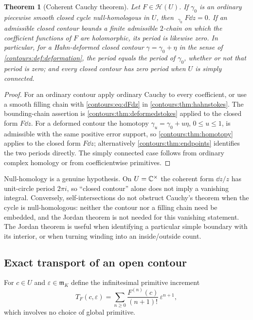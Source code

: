 \documentclass[11pt,letterpaper]{article}
\newtheorem{theorem}{Theorem}[section]
\theoremstyle{definition}
\theoremstyle{remark}
\newcommand{\HH}{\mathcal H}\newcommand{\A}{\mathscr A}\newcommand{\OO}{\mathcal O}
\newcommand{\m}{\mathfrak m}\newcommand{\st}{\operatorname{st}}
\newcommand{\HCoint}{\mathop{\oint^{\!H}}\nolimits}
\numberwithin{equation}{section}
\begin{document}
\begin{theorem}[Coherent Cauchy theorem]\label{contours:thm:cauchy}
Let $F\in\HH(U)$. If $\gamma_0$ is an ordinary piecewise smooth closed cycle
null-homologous in $U$, then $\HCoint_{\gamma_0}F\dd z=0$. If an admissible closed
contour bounds a finite admissible $2$-chain on which the coefficient functions of
$F$ are holomorphic, its period is likewise zero. In particular, for a
Hahn-deformed closed contour $\gamma=\gamma_0+\eta$ in the sense of
\cref{contours:def:deformation}, the period equals the period of $\gamma_0$,
whether or not that period is zero; and every closed contour has zero period when
$U$ is simply connected.
\end{theorem}
\begin{proof}
For an ordinary contour apply ordinary Cauchy to every coefficient, or use a smooth
filling chain with \eqref{contours:eq:dFdz} in \cref{contours:thm:hahnstokes}. The
bounding-chain assertion is \cref{contours:thm:deformedstokes} applied to the
closed form $F\dd z$. For a deformed contour the homotopy $\gamma_u=\gamma_0+u\eta$,
$0\le u\le1$, is admissible with the same positive error support, so
\cref{contours:thm:homotopy} applies to the closed form $F\dd z$; alternatively
\cref{contours:thm:endpoints} identifies the two periods directly. The simply
connected case follows from ordinary complex homology or from coefficientwise
primitives.
\end{proof}

Null-homology is a genuine hypothesis. On $U=\mathbb C^\times$ the coherent form
$\dd z/z$ has unit-circle period $2\pi i$, so ``closed contour'' alone does not
imply a vanishing integral. Conversely, self-intersections do not obstruct
Cauchy's theorem when the cycle is null-homologous: neither the contour nor a
filling chain need be embedded, and the Jordan theorem is not needed for this
vanishing statement. The Jordan theorem is useful when identifying a particular
simple boundary with its interior, or when turning winding into an inside/outside
count.

\subsection{Exact transport of an open contour}
For $c\in U$ and $\varepsilon\in\m_K$ define the infinitesimal primitive increment
\begin{equation}\label{contours:eq:endpointT}
  T_F(c,\varepsilon)=\sum_{n\ge0}\frac{F^{(n)}(c)}{(n+1)!}\,\varepsilon^{n+1},
\end{equation}
which involves no choice of global primitive.
\end{document}
